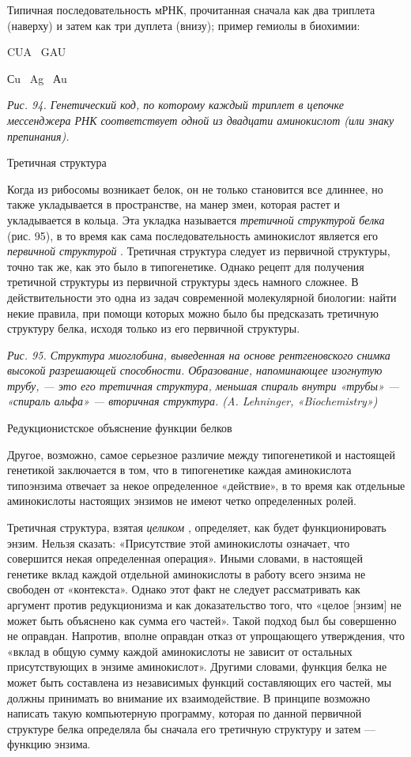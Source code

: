 Типичная последовательность мРНК, прочитанная сначала как два триплета (наверху) и затем как три дуплета (внизу); пример гемиолы в биохимии:

CUA ~GAU

Сu ~Ag ~Аu

\emph{Рис. 94. Генетический код, по которому каждый триплет в цепочке мессенджера РНК соответствует одной из двадцати аминокислот (или знаку препинания).}

Третичная структура

Когда из рибосомы возникает белок, он не только становится все длиннее, но также укладывается в пространстве, на манер змеи, которая растет и укладывается в кольца. Эта укладка называется \emph{третичной структурой белка} (рис. 95), в то время как сама последовательность аминокислот является его \emph{первичной структурой} . Третичная структура следует из первичной структуры, точно так же, как это было в типогенетике. Однако рецепт для получения третичной структуры из первичной структуры здесь намного сложнее. В действительности это одна из задач современной молекулярной биологии: найти некие правила, при помощи которых можно было бы предсказать третичную структуру белка, исходя только из его первичной структуры.

\emph{Рис. 95. Структура миоглобина, выведенная на основе рентгеновского снимка высокой разрешающей способности. Образование, напоминающее изогнутую трубу, --- это его третичная структура, меньшая спираль внутри «трубы» --- «спираль альфа» --- вторичная структура. (A. Lehninger, «Biochemistry»)}

Редукционистское объяснение функции белков

Другое, возможно, самое серьезное различие между типогенетикой и настоящей генетикой заключается в том, что в типогенетике каждая аминокислота типоэнзима отвечает за некое определенное «действие», в то время как отдельные аминокислоты настоящих энзимов не имеют четко определенных ролей.

Третичная структура, взятая \emph{целиком} , определяет, как будет функционировать энзим. Нельзя сказать: «Присутствие этой аминокислоты означает, что совершится некая определенная операция». Иными словами, в настоящей генетике вклад каждой отдельной аминокислоты в работу всего энзима не свободен от «контекста». Однако этот факт не следует рассматривать как аргумент против редукционизма и как доказательство того, что «целое {[}энзим{]} не может быть объяснено как сумма его частей». Такой подход был бы совершенно не оправдан. Напротив, вполне оправдан отказ от упрощающего утверждения, что «вклад в общую сумму каждой аминокислоты не зависит от остальных присутствующих в энзиме аминокислот». Другими словами, функция белка не может быть составлена из независимых функций составляющих его частей, мы должны принимать во внимание их взаимодействие. В принципе возможно написать такую компьютерную программу, которая по данной первичной структуре белка определяла бы сначала его третичную структуру и затем --- функцию энзима.

